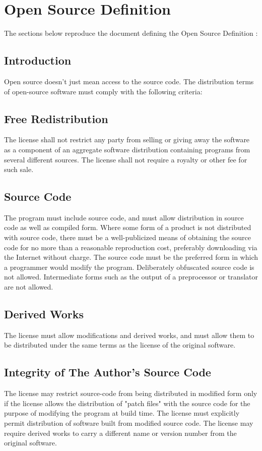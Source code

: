 \chapter{Open Source Definition}
\label{appendix:chap:open-source-definition}

The sections below reproduce the document defining the Open Source Definition \cite{perens1999open}:

\section{Introduction}

Open source doesn't just mean access to the source code. The distribution terms of open-source software must comply with the following criteria:

\section{Free Redistribution}
The license shall not restrict any party from selling or giving away the software as a component of an aggregate software distribution containing programs from several different sources. The license shall not require a royalty or other fee for such sale.

\section{Source Code}
The program must include source code, and must allow distribution in source code as well as compiled form. Where some form of a product is not distributed with source code, there must be a well-publicized means of obtaining the source code for no more than a reasonable reproduction cost, preferably downloading via the Internet without charge. The source code must be the preferred form in which a programmer would modify the program. Deliberately obfuscated source code is not allowed. Intermediate forms such as the output of a preprocessor or translator are not allowed.

\section{Derived Works}
The license must allow modifications and derived works, and must allow them to be distributed under the same terms as the license of the original software.

\section{Integrity of The Author's Source Code}
The license may restrict source-code from being distributed in modified form only if the license allows the distribution of "patch files" with the source code for the purpose of modifying the program at build time. The license must explicitly permit distribution of software built from modified source code. The license may require derived works to carry a different name or version number from the original software.

